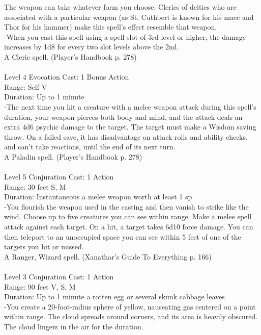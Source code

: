 \documentclass[10pt,twocolumn]{report}
\begin{document}
The weapon can take whatever form you choose. Clerics of deities who are associated with a particular weapon (as St. Cuthbert is known for his mace and Thor for his hammer) make this spell’s effect resemble that weapon.\\
-When you cast this spell using a spell slot of 3rd level or higher, the damage increases by 1d8 for every two slot levels above the 2nd.\\
A Cleric spell. (Player's Handbook p. 278) \\


 \\
Level 4 \quad Evocation \quad Cast: 1 Bonus Action\\
Range: Self \quad V\\
Duration: Up to 1 minute \quad \\
-The next time you hit a creature with a melee weapon attack during this spell’s duration, your weapon pierces both body and mind, and the attack deals an extra 4d6 psychic damage to the target. The target must make a Wisdom saving throw. On a failed save, it has disadvantage on attack rolls and ability checks, and can’t take reactions, until the end of its next turn.\\
A Paladin spell. (Player's Handbook p. 278) \\


 \\
Level 5 \quad Conjuration \quad Cast: 1 Action\\
Range: 30 feet \quad S, M\\
Duration: Instantaneous \quad a melee weapon worth at least 1 sp\\
-You flourish the weapon used in the casting and then vanish to strike like the wind. Choose up to five creatures you can see within range. Make a melee spell attack against each target. On a hit, a target takes 6d10 force damage.
You can then teleport to an unoccupied space you can see within 5 feet of one of the targets you hit or missed.\\
A Ranger, Wizard spell. (Xanathar's Guide To Everything p. 166) \\


 \\
Level 3 \quad Conjuration \quad Cast: 1 Action\\
Range: 90 feet \quad V, S, M\\
Duration: Up to 1 minute \quad a rotten egg or several skunk cabbage leaves\\
-You create a 20-foot-radius sphere of yellow, nauseating gas centered on a point within range. The cloud spreads around corners, and its area is heavily obscured. The cloud lingers in the air for the duration.
\end{document}
